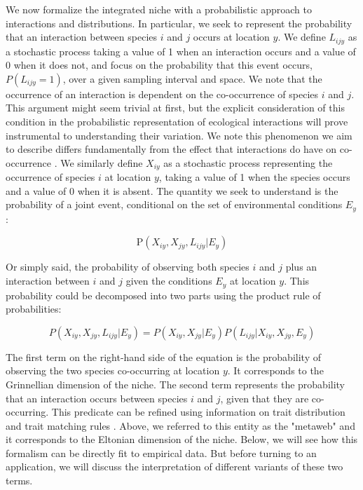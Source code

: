 \documentclass[12pt]{article}
\begin{document}
We now formalize the integrated niche with a probabilistic approach to
interactions and distributions. In particular, we seek to represent the
probability that an interaction between species $i$ and $j$ occurs at location
$y$. We define $L_{ijy}$ as a stochastic process taking a value of 1 when an
interaction occurs and a value of 0 when it does not, and focus on the
probability that this event occurs, $P(L_{ijy} = 1)$, over a given sampling
interval and space. We note that the occurrence of an interaction is dependent
on the co-occurrence of species $i$ and $j$. This argument might seem trivial
at first, but the explicit consideration of this condition in the
probabilistic representation of ecological interactions will prove
instrumental to understanding their variation. We note this phenomenon we aim
to describe differs fundamentally from the effect that interactions do have on
co-occurrence \citep{Cazelles2016}. We similarly define $X_{iy}$ as a
stochastic process representing the occurrence of species $i$ at location
$y$, taking a value of 1 when the species occurs and a value of 0 when it is
absent. The quantity we seek to understand is the probability of a joint
event, conditional on the set of environmental conditions $E_y$:

\begin{equation}
	\text{P}(X_{iy},X_{jy},L_{ijy}|E_y)
\end{equation}

Or simply said, the probability of observing both species $i$ and $j$ plus an
interaction between $i$ and $j$ given the conditions $E_y$ at location $y$.
This probability could be decomposed into two parts using the product rule of
probabilities:

\begin{equation}
	P(X_{iy},X_{jy},L_{ijy}|E_y)=P(X_{iy},X_{jy}|E_y)P(L_{ijy}|X_{iy},X_{jy},E_y)
\end{equation}

The first term on the right-hand side of the equation is the probability
of observing the two species co-occurring at location $y$. It corresponds
to the Grinnellian dimension of the niche. The second term represents the
probability that an interaction occurs between species $i$ and $j$, given that
they are co-occurring. This predicate can be refined using information on
trait distribution and trait matching rules \citep{Bartomeus2016}.
Above, we referred to this entity as the "metaweb" and it corresponds to
the Eltonian dimension of the niche. Below, we will see how this formalism
can be directly fit to empirical data. But before turning to an application,
we will discuss the interpretation of different variants of these two terms.
\end{document}

